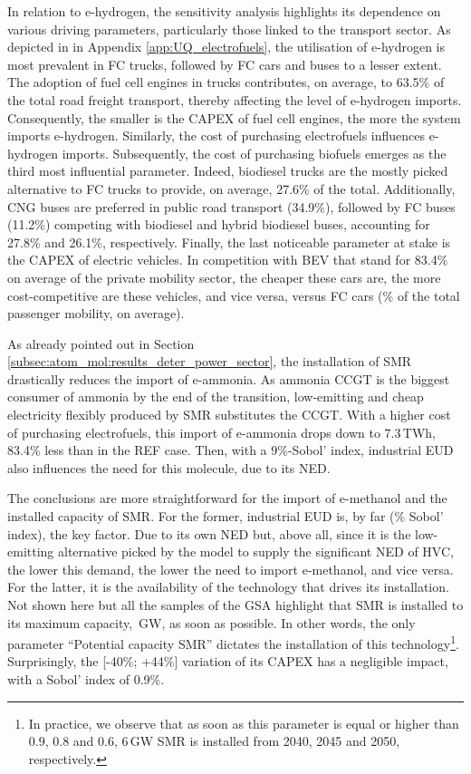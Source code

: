 In relation to e-hydrogen, the sensitivity analysis highlights its dependence on various driving parameters, particularly those linked to the transport sector. As depicted in  in Appendix \ref{app:UQ_electrofuels}, the utilisation of e-hydrogen is most prevalent in \gls{FC} trucks, followed by \gls{FC} cars and buses to a lesser extent. The adoption of fuel cell engines in trucks contributes, on average, to 63.5\% of the total road freight transport, thereby affecting the level of e-hydrogen imports. Consequently, the smaller is the CAPEX of fuel cell engines, the more the system imports e-hydrogen. Similarly, the cost of purchasing electrofuels influences e-hydrogen imports. Subsequently, the cost of purchasing biofuels emerges as the third most influential parameter. Indeed, biodiesel trucks are the mostly picked alternative to \gls{FC} trucks to provide, on average, 27.6\% of the total. Additionally, \gls{CNG} buses are preferred in public road transport (34.9\%), followed by \gls{FC} buses (11.2\%) competing with biodiesel and hybrid biodiesel buses, accounting for 27.8\% and 26.1\%, respectively. Finally, the last noticeable parameter at stake is the CAPEX of electric vehicles. In competition with \gls{BEV} that stand for 83.4\% on average of the private mobility sector, the cheaper these cars are, the more cost-competitive are these vehicles, and vice versa, versus \gls{FC} cars (\% of the total passenger mobility, on average).

As already pointed out in Section \ref{subsec:atom_mol:results_deter_power_sector}, the installation of \gls{SMR} drastically reduces the import of e-ammonia. As ammonia \gls{CCGT} is the biggest consumer of ammonia by the end of the transition, low-emitting and cheap electricity flexibly produced by \gls{SMR} substitutes the \gls{CCGT}. With a higher cost of purchasing electrofuels, this import of e-ammonia drops down to 7.3\,TWh, 83.4\% less than in the REF case. Then, with a 9\%-Sobol' index, industrial \gls{EUD} also influences the need for this molecule, due to its \gls{NED}.

The conclusions are more straightforward for the import of e-methanol and the installed capacity of \gls{SMR}. For the former, industrial \gls{EUD} is, by far (\% Sobol' index), the key factor. Due to its own \gls{NED} but, above all, since it is the low-emitting alternative picked by the model to supply the significant \gls{NED} of \gls{HVC}, the lower this demand, the lower the need to import e-methanol, and vice versa. For the latter, it is the availability of the technology that drives its installation. Not shown here but all the samples of the \gls{GSA} highlight that \gls{SMR} is installed to its maximum capacity, \,GW, as soon as possible. In other words, the only parameter ``Potential capacity \gls{SMR}'' dictates the installation of this technology\footnote{In practice, we observe that as soon as this parameter is equal or higher than 0.9, 0.8 and 0.6, 6\,GW \gls{SMR} is installed from 2040, 2045 and 2050, respectively.}. Surprisingly, the [-40\%; +44\%]  variation of its CAPEX has a negligible impact, with a Sobol' index of 0.9\%.

